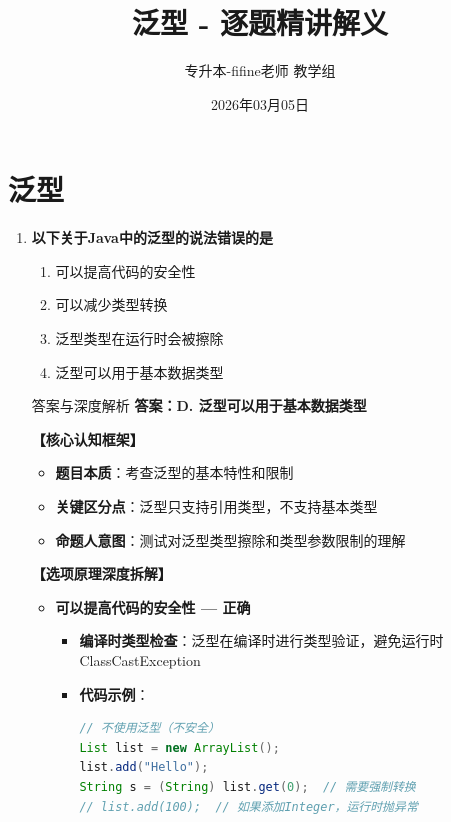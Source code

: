 \documentclass[12pt, a4paper]{ctexart}
\title{\textcolor{myblue}{\textbf{泛型 - 逐题精讲解义}}}
\author{专升本-fifine老师 教学组}
\date{2026年03月05日}
\begin{document}
\maketitle
\thispagestyle{empty}
\newpage

\section{泛型}

\begin{enumerate}[label=\textbf{\arabic*.}]

	\item \textbf{以下关于Java中的泛型的说法错误的是}
	      \begin{enumerate}[label=\Alph*.]
		      \item 可以提高代码的安全性
		      \item 可以减少类型转换
		      \item 泛型类型在运行时会被擦除
		      \item 泛型可以用于基本数据类型
	      \end{enumerate}

	      \begin{bluebox}{答案与深度解析}
		      \textbf{答案：D. 泛型可以用于基本数据类型}

		      \textbf{【核心认知框架】}
		      \begin{itemize}[label={}, leftmargin=*, nosep]
			      \item \textbf{题目本质}：考查泛型的基本特性和限制
			      \item \textbf{关键区分点}：泛型只支持引用类型，不支持基本类型
			      \item \textbf{命题人意图}：测试对泛型类型擦除和类型参数限制的理解
		      \end{itemize}

		      \textbf{【选项原理深度拆解】}

		      \begin{itemize}[leftmargin=*, nosep, label={}]
			      \item[A] \textbf{可以提高代码的安全性 — 正确}
			            \begin{itemize}[label={}, leftmargin=*, nosep]
				            \item \textbf{编译时类型检查}：泛型在编译时进行类型验证，避免运行时ClassCastException
				            \item \textbf{代码示例}：
				                  \begin{lstlisting}[language=Java]
// 不使用泛型（不安全）
List list = new ArrayList();
list.add("Hello");
String s = (String) list.get(0);  // 需要强制转换
// list.add(100);  // 如果添加Integer，运行时抛异常


\end{lstlisting}
\end{itemize}
\end{itemize}
\end{bluebox}
\end{enumerate}
\end{document}
